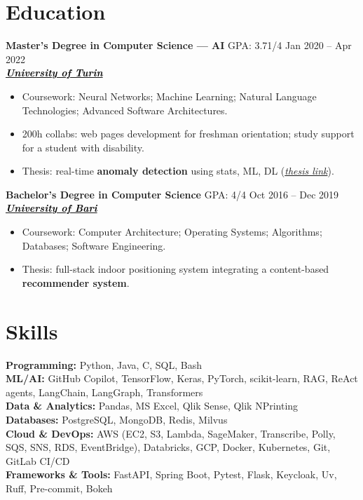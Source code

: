 \documentclass[11pt,a4paper]{article}
\let\OldHref\href
\renewcommand{\href}[2]{\OldHref{#1}{\textit{#2}}}
\begin{document}
    \section*{Education}
    {\small
        
        \textbf{Master’s Degree in Computer Science — AI} \hfill GPA: 3.71/4 \hspace{1em} Jan 2020 -- Apr 2022\\
        \hfill \href{https://www.unito.it/}{\textbf{\textcolor{black}{University of Turin}}}
        
        \begin{itemize}
            \item Coursework: Neural Networks; Machine Learning; Natural Language Technologies; Advanced Software Architectures.
            \item 200h collabs: web pages development for freshman orientation; study support for a student with disability.
            \item Thesis: real-time \textbf{anomaly detection} using stats, ML, DL (\href{https://unitesi.unito.it/handle/20.500.14240/78909}{thesis link}).
        \end{itemize}
        
        \textbf{Bachelor’s Degree in Computer Science} \hfill GPA: 4/4 \hspace{2em} Oct 2016 -- Dec 2019\\
        \hfill \href{https://www.uniba.it/it}{\textbf{\textcolor{black}{University of Bari}}}
        
        \begin{itemize}
            \item Coursework: Computer Architecture; Operating Systems; Algorithms; Databases; Software Engineering.
            \item Thesis: full-stack indoor positioning system integrating a content-based \textbf{recommender system}.
        \end{itemize}
    }
    
    \section*{Skills}
    {\small
        \textbf{Programming:} Python, Java, C, SQL, Bash \\
        \textbf{ML/AI:} GitHub Copilot, TensorFlow, Keras, PyTorch, scikit-learn, RAG, ReAct agents, LangChain, LangGraph, Transformers \\
        \textbf{Data \& Analytics:} Pandas, MS Excel, Qlik Sense, Qlik NPrinting \\
        \textbf{Databases:} PostgreSQL, MongoDB, Redis, Milvus \\
        \textbf{Cloud \& DevOps:} AWS (EC2, S3, Lambda, SageMaker, Transcribe, Polly, SQS, SNS, RDS, EventBridge), Databricks, GCP, Docker, Kubernetes, Git, GitLab CI/CD \\
        \textbf{Frameworks \& Tools:} FastAPI, Spring Boot, Pytest, Flask, Keycloak, Uv, Ruff, Pre-commit, Bokeh
    }
    
\end{document}
